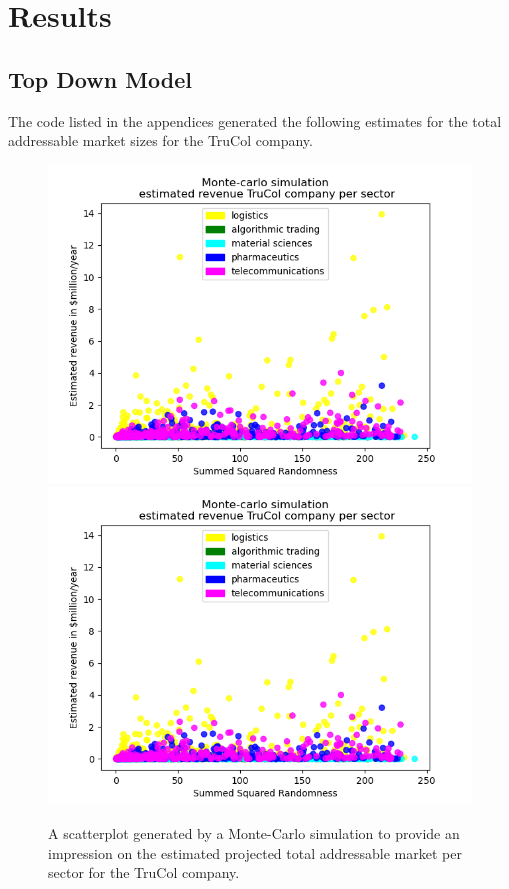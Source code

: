 \section{Results}\label{sec:results}
\subsection{Top Down Model}\label{subsec:results_top_down}
The code listed in the appendices generated the following estimates for the total addressable market sizes for the TruCol company.
\begin{figure}[H]
    \centering
    \ifx\homepath\overleafhome
		\includegraphics[width=0.5\linewidth]{Images/revenue_per_sector.png}
	\else
    \includegraphics[width=0.5\linewidth]{latex/Images/revenue_per_sector.png}
	\fi

    \caption{A scatterplot generated by a Monte-Carlo simulation to provide an impression on the estimated projected total addressable market per sector for the TruCol company.}
    \label{fig:per_sector}
\end{figure}

